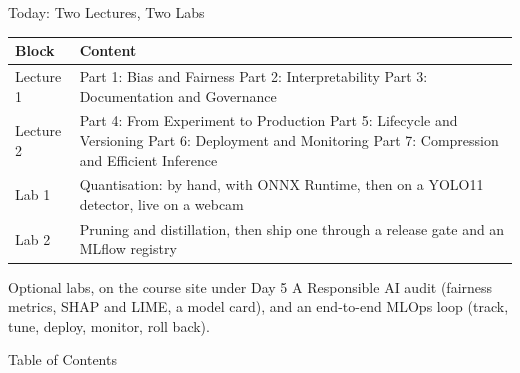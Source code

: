 \begin{frame}{Today: Two Lectures, Two Labs}
    \centering
    \renewcommand{\arraystretch}{1.2}
    {\small
    \begin{tabular}{>{\raggedright\arraybackslash}p{2.0cm}>{\raggedright\arraybackslash}p{9.6cm}}
        \toprule
        \textbf{Block} & \textbf{Content} \\
        \midrule
        Lecture 1 & Part 1: Bias and Fairness \newline Part 2: Interpretability \newline
                    Part 3: Documentation and Governance \\
        Lecture 2 & Part 4: From Experiment to Production \newline Part 5: Lifecycle and Versioning \newline
                    Part 6: Deployment and Monitoring \newline Part 7: Compression and Efficient Inference \\
        Lab 1     & Quantisation: by hand, with ONNX Runtime, then on a YOLO11 detector, live on a webcam \\
        Lab 2     & Pruning and distillation, then ship one through a release gate and an MLflow registry \\
        \bottomrule
    \end{tabular}}
    \vspace{0.5em}
    \begin{block}{Optional labs, on the course site under Day 5}
        A Responsible AI audit (fairness metrics, SHAP and LIME, a model card), and an end-to-end MLOps loop
        (track, tune, deploy, monitor, roll back).
    \end{block}
\end{frame}

\begin{frame}[allowframebreaks]{Table of Contents}
    \tableofcontents
\end{frame}
